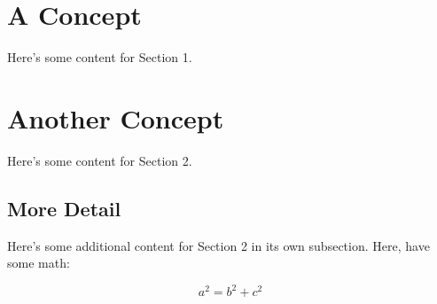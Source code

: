\documentclass[a4paper]{notes_class}
\begin{document}
\maketitle

\tableofcontents

\newpage

\section{A Concept}

Here's some content for Section 1.

\section{Another Concept}

Here's some content for Section 2.

\subsection{More Detail}

Here's some additional content for Section 2 in its own subsection. Here, have some math:

$$
a^2 = b^2 + c^2
$$
\end{document}
